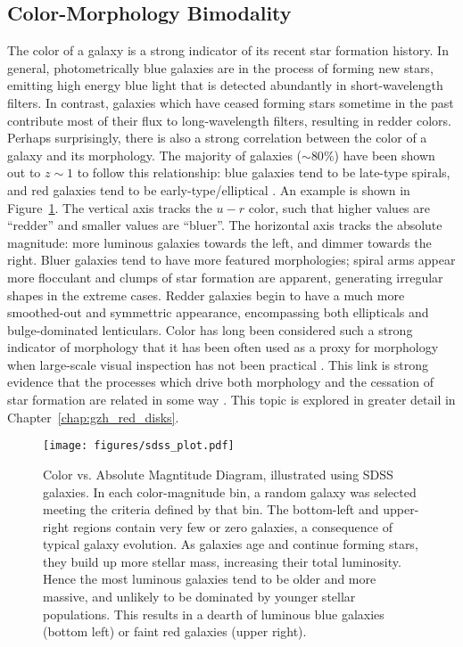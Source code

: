 \subsection{Color-Morphology Bimodality}

The color of a galaxy is a strong indicator of its recent star formation history. In general, photometrically blue galaxies are in the process of forming new stars, emitting high energy blue light that is detected abundantly in short-wavelength filters. In contrast, galaxies which have ceased forming stars sometime in the past contribute most of their flux to long-wavelength filters, resulting in redder colors. Perhaps surprisingly, there is also a strong correlation between the color of a galaxy and its morphology. The majority of galaxies ($\sim80\%$) have been shown out to $z\sim1$ to follow this relationship: blue galaxies tend to be late-type spirals, and red galaxies tend to be early-type/elliptical \citep{Tully1982,Strateva2001,Baldry2004,Conselice2006,Martin2007,Mignoli2009}. An example is shown in Figure~\ref{fig:cmd}. The vertical axis tracks the $u-r$ color, such that higher values are ``redder'' and smaller values are ``bluer''. The horizontal axis tracks the absolute magnitude: more luminous galaxies towards the left, and dimmer towards the right. Bluer galaxies tend to have more featured morphologies; spiral arms appear more flocculant and clumps of star formation are apparent, generating irregular shapes in the extreme cases. Redder galaxies begin to have a much more smoothed-out and symmettric appearance, encompassing both ellipticals and bulge-dominated lenticulars. Color has long been considered such a strong indicator of morphology that it has been often used as a proxy for morphology when large-scale visual inspection has not been practical \citep{Cooray2005,Lee2007,Salimbeni2008,Simon2009}. This link is strong evidence that the processes which drive both morphology and the cessation of star formation are related in some way \citep{Masters2010,Buta2013}. This topic is explored in greater detail in Chapter~\ref{chap:gzh_red_disks}. 

\begin{figure}
\centering
\texttt{[image: figures/sdss\_plot.pdf]}
\label{fig:cmd}
\caption{Color vs. Absolute Magntitude Diagram, illustrated using SDSS galaxies. In each color-magnitude bin, a random galaxy was selected meeting the criteria defined by that bin. The bottom-left and upper-right regions contain very few or zero galaxies, a consequence of typical galaxy evolution. As galaxies age and continue forming stars, they build up more stellar mass, increasing their total luminosity. Hence the most luminous galaxies tend to be older and more massive, and unlikely to be dominated by younger stellar populations. This results in a dearth of luminous blue galaxies (bottom left) or faint red galaxies (upper right).  }
\end{figure}

